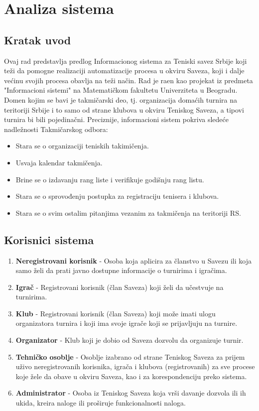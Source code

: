 \documentclass{article}
\begin{document}
\section{Analiza sistema}
\subsection{Kratak uvod}
Ovaj rad predstavlja predlog Informacionog sistema za Teniski savez Srbije koji teži da pomogne realizaciji automatizacije procesa u okviru Saveza, koji i dalje većinu svojih procesa obavlja na teži način. Rad je ra\dj en kao projekat iz predmeta "Informacioni sistemi" na Matematičkom fakultetu Univerziteta u Beogradu. Domen kojim se bavi je takmičarski deo, tj. organizacija domaćih turnira na teritoriji Srbije i to samo od strane klubova u okviru Teniskog Saveza, a tipovi turnira bi bili pojedinačni. 
Preciznije, informacioni sistem pokriva sledeće nadležnosti Takmičarskog odbora:
\begin{itemize}
\item Stara se o organizaciji teniskih takimičenja.
\item Usvaja kalendar takmičenja.
\item Brine se o izdavanju rang liste i verifikuje godišnju rang listu.
\item Stara se o sprovođenju postupka za registraciju tenisera i klubova.
\item Stara se o svim ostalim pitanjima vezanim za takmičenja na teritoriji RS.   
\end{itemize}


\subsection{Korisnici sistema}
\begin{enumerate}
        \item \textbf{Neregistrovani korisnik} - Osoba koja aplicira za članstvo u Savezu ili koja samo želi da prati javno dostupne informacije o turnirima i igračima.
        \item \textbf{Igrač} - Registrovani korisnik (član Saveza) koji želi da učestvuje na turnirima.
        \item \textbf{Klub} - Registrovani korisnik (član Saveza) koji može imati ulogu organizatora turnira i koji ima svoje igrače koji se prijavljuju na turnire. 
        \item \textbf{Organizator} - Klub koji je dobio od Saveza dozvolu da organizuje turnir.
        \item \textbf{Tehničko osoblje} - Osoblje izabrano od strane Teniskog Saveza za prijem uživo neregistrovanih korisnika, igrača i klubova (registrovanih) za sve procese koje žele da obave u okviru Saveza, kao i za korespondenciju preko sistema.
        \item \textbf{Administrator} - Osoba iz Teniskog Saveza koja vrši davanje dozvola ili ih ukida, kreira naloge ili proširuje funkcionalnosti naloga.

    \end{enumerate}
    
\end{document}

